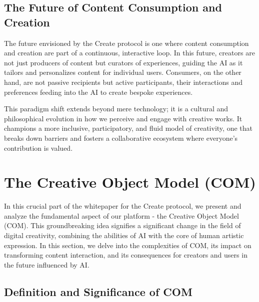\documentclass[12pt,a4paper]{article}
\begin{document}
\subsection{The Future of Content Consumption and Creation}

The future envisioned by the Create protocol is one where content consumption and creation are part of a continuous, interactive loop. In this future, creators are not just producers of content but curators of experiences, guiding the AI as it tailors and personalizes content for individual users. Consumers, on the other hand, are not passive recipients but active participants, their interactions and preferences feeding into the AI to create bespoke experiences.

This paradigm shift extends beyond mere technology; it is a cultural and philosophical evolution in how we perceive and engage with creative works. It champions a more inclusive, participatory, and fluid model of creativity, one that breaks down barriers and fosters a collaborative ecosystem where everyone’s contribution is valued.

\noindent{}

\pagebreak

\section{The Creative Object Model (COM)}

In this crucial part of the whitepaper for the Create protocol, we present and analyze the fundamental aspect of our platform - the Creative Object Model (COM). This groundbreaking idea signifies a significant change in the field of digital creativity, combining the abilities of AI with the core of human artistic expression. In this section, we delve into the complexities of COM, its impact on transforming content interaction, and its consequences for creators and users in the future influenced by AI.

\subsection{Definition and Significance of COM}
\end{document}
